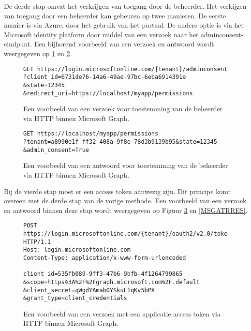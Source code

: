 De derde stap omvat het verkrijgen van toegang door de beheerder. Het verkijgen van toegang door een beheerder kan gebeuren op twee manieren. De eerste manier is via Azure, door het gebruik van het portaal. De andere optie is via het Microsoft identity platform door middel van een verzoek naar het adminconsent-eindpunt. Een bijhorend voorbeeld van een verzoek en antwoord wordt weergegeven op \ref{MSGRAR} en \ref{MSGRARES}. \\

\begin{figure}[!h]
    \footnotesize\begin{verbatim}
GET https://login.microsoftonline.com/{tenant}/adminconsent
?client_id=6731de76-14a6-49ae-97bc-6eba6914391e
&state=12345
&redirect_uri=https://localhost/myapp/permissions
    \end{verbatim}    
    \caption[Voorbeeld Adminconsent request Microsoft Graph]{Een voorbeeld van een verzoek voor toestemming van de beheerder via \ac{HTTP} binnen Microsoft Graph.}
    \label{MSGRAR}
\end{figure}

\begin{figure}[!h]
    \footnotesize\begin{verbatim}
GET https://localhost/myapp/permissions
?tenant=a8990e1f-ff32-408a-9f8e-78d3b9139b95&state=12345
&admin_consent=True
    \end{verbatim}    
    \caption[Voorbeeld Adminconsent respons Microsoft Graph]{Een voorbeeld van een antwoord voor toestemming van de beheerder via \ac{HTTP} binnen Microsoft Graph.}
    \label{MSGRARES}
\end{figure}

Bij de vierde stap moet er een access token aanwezig zijn. Dit principe komt overeen met de derde stap van de vorige methode. Een voorbeeld van een verzoek en antwoord binnen deze stap wordt weergegeven op Figuur \ref{MSGATRR} en \ref{MSGATRRES}. \\

\begin{figure}[!h]
    \footnotesize\begin{verbatim}
POST https://login.microsoftonline.com/{tenant}/oauth2/v2.0/token HTTP/1.1
Host: login.microsoftonline.com
Content-Type: application/x-www-form-urlencoded

client_id=535fb089-9ff3-47b6-9bfb-4f1264799865
&scope=https%3A%2F%2Fgraph.microsoft.com%2F.default
&client_secret=qWgdYAmab0YSkuL1qKv5bPX
&grant_type=client_credentials 
    \end{verbatim}    
    \caption[Voorbeeld Application Token Request Microsoft Graph]{Een voorbeeld van een verzoek met een applicatie access token via \ac{HTTP} binnen Microsoft Graph.}
    \label{MSGATRR}
\end{figure}

